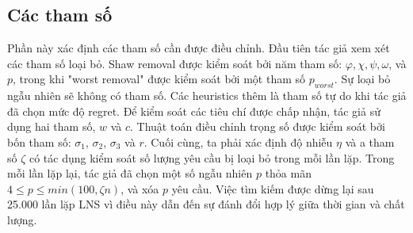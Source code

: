 \subsection{Các tham số}
Phần này xác định các tham số cần được điều chỉnh. Đầu tiên tác giả xem xét các tham số loại bỏ. Shaw removal được kiểm soát bởi năm tham số: $\varphi, \chi, \psi, \omega$, và $p$, trong khi "worst removal" được kiểm soát bởi một tham số $p_{worst}$. Sự loại bỏ ngẫu nhiên sẽ không có tham số. Các heuristics thêm là tham số tự do khi tác giả đã chọn mức độ regret.
Để kiểm soát các tiêu chí được chấp nhận, tác giả sử dụng hai tham số, $w$ và $c$. Thuật toán điều chỉnh trọng số được kiểm soát bởi bốn tham số: $\sigma_1$, $\sigma_2$, $\sigma_3$ và $r$. Cuối cùng, ta phải xác định độ nhiễu $\eta$ và a tham số $\zeta$ có tác dụng kiểm soát số lượng yêu cầu bị loại bỏ trong mỗi lần lặp. Trong mỗi lần lặp lại, tác giả đã chọn một số ngẫu nhiên $p$ thỏa mãn $4 \leq p \leq min(100, \zeta n)$, và xóa $p$ yêu cầu. Việc tìm kiếm được dừng lại sau 25.000 lần lặp LNS vì điều này dẫn đến sự đánh đổi hợp lý giữa thời gian và chất lượng.

